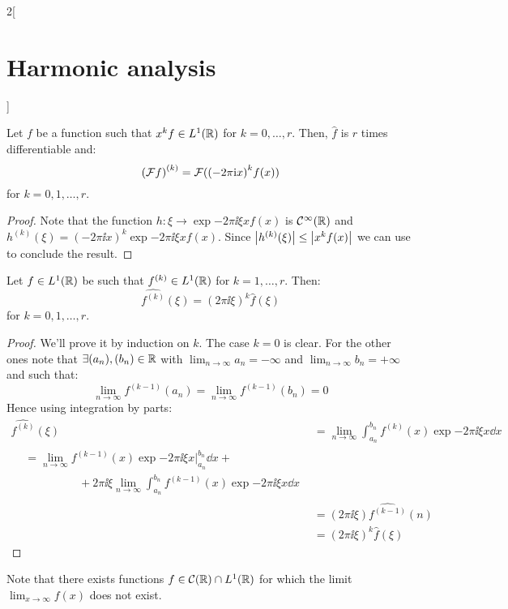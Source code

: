 \documentclass[../../../main_math.tex]{subfiles}
\begin{document}
\begin{multicols}{2}[\section{Harmonic analysis}]
\begin{proposition}
    Let $f$ be a function such that $x^k f\in L^1(\mathbb{R})$ for $k=0,\ldots,r$. Then, $\widehat{f}$ is $r$ times differentiable and:
    $${(\mathcal{F} f)}^{(k)}=\mathcal{F}({(-2\pi\mathrm{i} x)}^kf(x))$$
    for $k=0,1,\ldots, r$.
  \end{proposition}
  \begin{proof}
    Note that the function $h:\xi\rightarrow\exp{-2\pi\ii \xi x}f(x)$ is $\mathcal{C}^\infty(\mathbb{R})$ and $h^{(k)}(\xi)={(-2\pi\ii x)}^k\exp{-2\pi\ii \xi x}f(x)$. Since $\abs{h^{(k)}(\xi)}\leq \abs{x^kf(x)}$ we can use  to conclude the result.
  \end{proof}
  \begin{proposition}\label{HA:diffFourierTransf}
    Let $f\in L^1(\mathbb{R})$ be such that $f^{(k)}\in L^1(\mathbb{R})$ for $k=1,\ldots,r$. Then: $$\widehat{f^{(k)}}(\xi)={(2\pi\ii\xi)}^k\widehat{f}(\xi)$$ for $k=0,1,\ldots, r$.
  \end{proposition}
  \begin{proof}
    We'll prove it by induction on $k$. The case $k=0$ is clear.
    For the other ones note that $\exists(a_n),(b_n)\in\mathbb{R}$ with $\displaystyle\lim_{n\to\infty}a_n=-\infty$ and $\displaystyle\lim_{n\to\infty}b_n=+\infty$ and such that:
    $$\lim_{n\to\infty}f^{(k-1)}(a_n)=\lim_{n\to\infty}f^{(k-1)}(b_n)=0$$
    Hence using integration by parts:
    \begin{align*}
      \widehat{f^{(k)}}(\xi) & =\lim_{n\to\infty}\int_{a_n}^{b_n} f^{(k)}(x)\exp{-2\pi\ii \xi x}\dd{x} \\
      \begin{split}
        & =\lim_{n\to\infty}  f^{(k-1)}(x)\exp{-2\pi\ii \xi x}\Big|_{a_n}^{b_n}\dd{x} +\\
        &\hspace{2cm}+2\pi\ii \xi\lim_{n\to\infty}\int_{a_n}^{b_n}f^{(k-1)}(x)\exp{-2\pi\ii \xi x}\dd{x}
      \end{split}  \\
                             & =\left(2\pi\ii \xi\right)\widehat{f^{(k-1)}}(n)                         \\
                             & ={\left(2\pi\ii \xi\right)}^k\widehat{f}(\xi)
    \end{align*}
  \end{proof}
  \begin{remark}
    Note that there exists functions $f\in\mathcal{C}(\mathbb{R})\cap L^1(\mathbb{R})$ for which the limit $\displaystyle\lim_{x\to\infty} f(x)$ does not exist.
  \end{remark}

\end{multicols}
\end{document}

